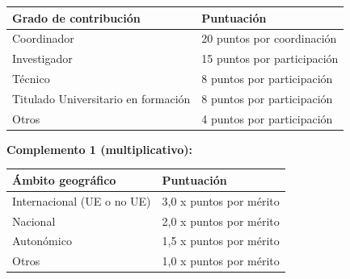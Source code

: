\documentclass{article}
\begin{document}
\begin{itemize}
\begin{itemize}
\begin{scriptsize}
                  \vspace{0.4cm}
                  \begin{table}[h!]\centering\renewcommand{\arraystretch}{1.3}
                    \begin{tabular}{|p{}|p{}|}\hline
                      Grado de contribución               & Puntuación                  \\\hline
                      Coordinador                         & 20 puntos por coordinación  \\\hline
                      Investigador                        & 15 puntos por participación \\\hline
                      Técnico                             & 8 puntos por participación  \\\hline
                      Titulado Universitario en formación & 8 puntos por participación  \\\hline
                      Otros                               & 4 puntos por participación  \\\hline
                    \end{tabular}\end{table}
                  \vspace{0.4cm}

                  \textbf{Complemento 1 (multiplicativo):}
                  \vspace{0.4cm}
                  \begin{table}[h!]\centering\renewcommand{\arraystretch}{1.3}
                    \begin{tabular}{|p{}|p{}|}\hline
                      Ámbito geográfico          & Puntuación              \\\hline
                      Internacional (UE o no UE) & 3,0 x puntos por mérito \\\hline
                      Nacional                   & 2,0 x puntos por mérito \\\hline
                      Autonómico                 & 1,5 x puntos por mérito \\\hline
                      Otros                      & 1,0 x puntos por mérito \\\hline
                    \end{tabular}\end{table}
                  \vspace{0.4cm}


\end{scriptsize}
\end{itemize}
\end{itemize}
\end{document}
